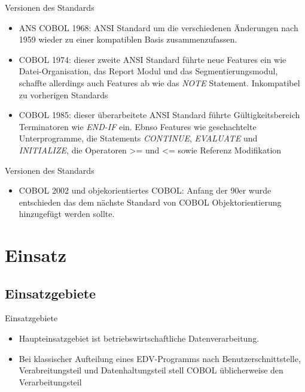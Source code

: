 \documentclass{beamer}
\begin{document}
\begin{frame}{Versionen des Standards}
  \begin{itemize}
  \item
    ANS COBOL 1968: ANSI Standard um die verschiedenen Änderungen nach 1959 wieder zu einer kompatiblen Basis zusammenzufassen.
  \item
    COBOL 1974: dieser zweite ANSI Standard führte neue Features ein wie Datei-Organisation, das Report Modul und das Segmentierungsmodul, schaffte allerdings auch Features ab wie das \emph{NOTE} Statement. Inkompatibel zu vorherigen Standards
  \item
    COBOL 1985: dieser überarbeitete ANSI Standard führte Gültigkeitsbereich Terminatoren wie \emph{END-IF} ein. Ebnso Features wie geschachtelte Unterprogramme, die Statements \emph{CONTINUE}, \emph{EVALUATE} und \emph{INITIALIZE}, die Operatoren >= und <= sowie Referenz Modifikation
  \end{itemize}
\end{frame}

\begin{frame}{Versionen des Standards}
  \begin{itemize}
    \item
      COBOL 2002 und objekorientiertes COBOL: Anfang der 90er wurde entschieden das dem nächste Standard von COBOL Objektorientierung hinzugefügt werden sollte.
  \end{itemize}
\end{frame}

\section{Einsatz}

\subsection{Einsatzgebiete}

\begin{frame}{Einsatzgebiete}
  \begin{itemize}
		\item
			Haupteinsatzgebiet ist betriebswirtschaftliche Datenverarbeitung.
		\item
			Bei klassischer Aufteilung eines EDV-Programms nach Benutzerschnittstelle, Verabreitungsteil und Datenhaltungsteil stell COBOL \"ublicherweise den Verarbeitungsteil
	\end{itemize}
\end{frame}
\end{document}
